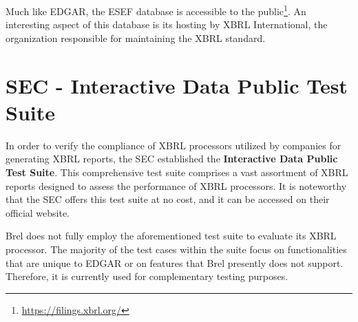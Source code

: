 Much like EDGAR, the ESEF database is accessible to the public\footnote{\url{https://filings.xbrl.org/}}. 
An interesting aspect of this database is its hosting by XBRL International, the organization responsible for maintaining the XBRL standard.

\section{SEC - Interactive Data Public Test Suite}
\label{sec:idpts}
In order to verify the compliance of XBRL processors utilized by companies for generating XBRL reports, 
the SEC established the 
\textcolor{turkishrose}{\textbf{Interactive Data Public Test Suite}}\cite{sec_idpts}.
This comprehensive test suite comprises a vast assortment of XBRL reports designed to assess the performance of XBRL processors.
It is noteworthy that the SEC offers this test suite at no cost, and it can be accessed on their official website.

Brel does not fully employ the aforementioned test suite to evaluate its XBRL processor.
The majority of the test cases within the suite focus on functionalities that are unique to EDGAR or on features that Brel presently does not support.
Therefore, it is currently used for complementary testing purposes.

